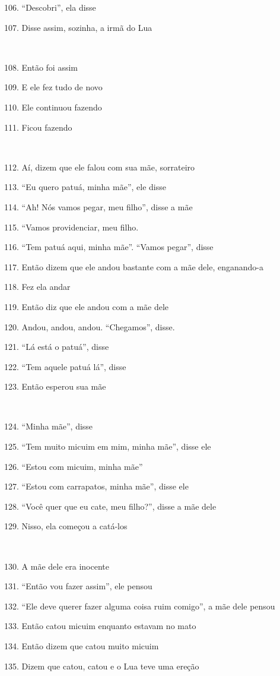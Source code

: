 106. ``Descobri'', ela disse

107. Disse assim, sozinha, a irmã do Lua

~

108. Então foi assim

109. E ele fez tudo de novo

110. Ele continuou fazendo

111. Ficou fazendo

~

112. Aí, dizem que ele falou com sua mãe, sorrateiro

113. ``Eu quero patuá, minha mãe'', ele disse

114. ``Ah! Nós vamos pegar, meu filho'', disse a mãe

115. ``Vamos providenciar, meu filho.

116. ``Tem patuá aqui, minha mãe''. ``Vamos pegar'', disse

117. Então dizem que ele andou bastante com a mãe dele, enganando-a

118. Fez ela andar

119. Então diz que ele andou com a mãe dele

120. Andou, andou, andou. ``Chegamos'', disse.

121. ``Lá está o patuá'', disse

122. ``Tem aquele patuá lá'', disse

123. Então esperou sua mãe

~

124. ``Minha mãe'', disse

125. ``Tem muito micuim em mim, minha mãe'', disse ele

126. ``Estou com micuim, minha mãe''

127. ``Estou com carrapatos, minha mãe'', disse ele

128. ``Você quer que eu cate, meu filho?'', disse a mãe dele

129. Nisso, ela começou a catá-los

~

130. A mãe dele era inocente

131. ``Então vou fazer assim'', ele pensou

132. ``Ele deve querer fazer alguma coisa ruim comigo'', a mãe dele pensou

133. Então catou micuim enquanto estavam no mato

134. Então dizem que catou muito micuim

135. Dizem que catou, catou e o Lua teve uma ereção

